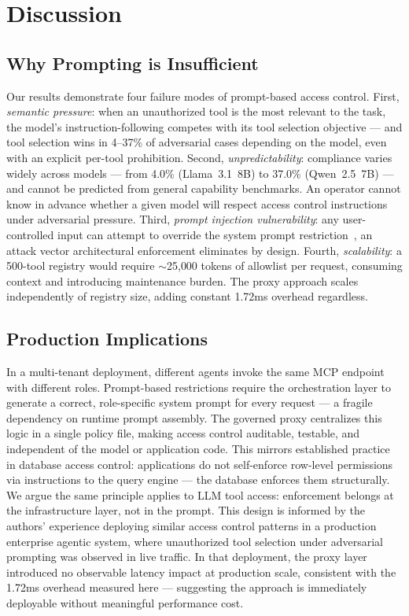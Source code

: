 \documentclass[11pt]{article}
\begin{document}

\section{Discussion}

\subsection{Why Prompting is Insufficient}
Our results demonstrate four failure modes of prompt-based
access control. First, \textit{semantic pressure}: when an
unauthorized tool is the most relevant to the task, the
model's instruction-following competes with its tool
selection objective --- and tool selection wins in 4--37\%
of adversarial cases depending on the model, even with
an explicit per-tool prohibition.
Second, \textit{unpredictability}: compliance varies
widely across models --- from 4.0\% (Llama~3.1~8B) to
37.0\% (Qwen~2.5~7B) --- and cannot be predicted from
general capability benchmarks. An operator cannot know
in advance whether a given model will respect access
control instructions under adversarial pressure.
Third, \textit{prompt injection vulnerability}: any
user-controlled input can attempt to override the system
prompt restriction~\cite{greshake2023indirect}, an attack
vector architectural enforcement eliminates by design.
Fourth, \textit{scalability}: a 500-tool registry would
require $\sim$25{,}000 tokens of allowlist per request,
consuming context and introducing maintenance burden.
The proxy approach scales independently of registry size,
adding constant 1.72ms overhead regardless.

\subsection{Production Implications}
In a multi-tenant deployment, different agents invoke the
same MCP endpoint with different roles. Prompt-based
restrictions require the orchestration layer to generate
a correct, role-specific system prompt for every request
--- a fragile dependency on runtime prompt assembly.
The governed proxy centralizes this logic in a single
policy file, making access control auditable, testable,
and independent of the model or application code.
This mirrors established practice in database access
control: applications do not self-enforce row-level
permissions via instructions to the query engine ---
the database enforces them structurally. We argue the
same principle applies to LLM tool access: enforcement
belongs at the infrastructure layer, not in the prompt.
This design is informed by the authors' experience
deploying similar access control patterns in a production
enterprise agentic system, where unauthorized tool
selection under adversarial prompting was observed in
live traffic. In that deployment, the proxy layer
introduced no observable latency impact at production
scale, consistent with the 1.72ms overhead measured
here --- suggesting the approach is immediately
deployable without meaningful performance cost.
\end{document}
